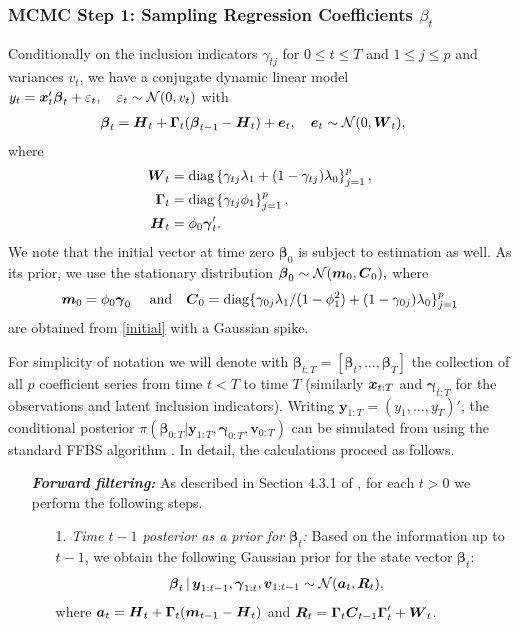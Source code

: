 \documentclass[ba]{imsart}
\numberwithin{equation}{section}
\theoremstyle{plain}
\def\a{\mbox{\boldmath$a$}}
\def\H{\mbox{\boldmath$H$}}
\def\bR{\mbox{\boldmath$R$}}
\def\bG{\bm{\Gamma}}
\def\bC{\mbox{\boldmath$C$}}
\def\x{\mbox{\boldmath$x$}}
\def\y{\mbox{\boldmath$y$}}
\def\b{\mbox{\boldmath$b$}}
\def\W{\mbox{\boldmath$W$}}
\def\m{\mbox{\boldmath$m$}}
\def\seq#1#2{#1{:}#2}
\newcommand{\bm}[1]{\boldsymbol{#1}}
\def\W{\bm{W}}
\def\y{\bm{y}}
\def\bg{\bm{\gamma}}
\def\b{\bm{\beta}}
\begin{document}
{{\subsubsection{MCMC  Step 1: Sampling Regression Coefficients $\beta_t$} 
Conditionally on the inclusion indicators $\gamma_{tj}$ for $0\leq t\leq T$ and $1\leq j\leq p$ and variances $v_t$,  we  have a  conjugate dynamic linear model  $y_t=\x_t'\b_t+\varepsilon_t, \quad \varepsilon_t\sim \mathcal{N}(0,v_t)$ with
\begin{align*}
	\b_t&=\H_t+\bG_t(\b_{t-1}-\H_t)+\bm{e}_t, \quad \bm{e}_t\sim \mathcal{N}(0, \W_t),
\end{align*}
 where
 \begin{align}
 \W_t&=\textrm{diag}\left\{\gamma_{tj}\lambda_{1}+(1-\gamma_{tj})\lambda_{0}\right\}_{j=1}^p,\label{variance_state}\\
 \bG_t &= \textrm{diag}\left\{\gamma_{tj}\phi_{1}\right\}_{j=1}^p,\\
 \H_t &= \phi_0\bg_t'.
 \end{align}
 We note that the initial vector at time zero $\b_{0}$ is subject to estimation as well. As its prior, we use the stationary distribution $\b_{0}\sim\mathcal{N}(\m_0 , \bC_0),$
 where 
 \begin{equation}\label{muC}
 \m_0=\phi_0\bg_0\quad\text{ and} \quad \bC_0=\mathrm{diag}\{\gamma_{0j}\lambda_1/(1-\phi_1^2)+(1-\gamma_{0j})\lambda_0\}_{j=1}^p
 \end{equation}
  are obtained from \eqref{initial} with a Gaussian spike.


  
For simplicity of notation we will denote  with $\b_{t:T}=[\b_{t},\dots,\b_T]$ the collection of all $p$ coefficient series from time $t<T$ to time $T$ (similarly $\x_{t:T}$ and $\bg_{t:T}$ for the observations and latent inclusion indicators). Writing   $\y_{1:T}=(y_1,\dots, y_T)'$, 
the conditional posterior $\pi(\b_{0:T}|\y_{\seq1T},\bg_{0:T},\bm v_{0:T})$ can be simulated  from using the standard  FFBS 
algorithm \citep{Schnatter1994}.  In detail, the calculations  proceed as follows. 

\begin{itemize} 
\item[]{\em\bf Forward filtering:} As described in Section 4.3.1 of \cite{Prado2010}, for each $t>0$ we perform the following steps.
\begin{itemize} 
	\item[1.]{\em Time $t-1$ posterior as a prior for $\b_t$:} Based on the information up to $t-1$, we obtain the following Gaussian prior for the state vector $\b_t$:
		\begin{align*}
		\b_{t}\,|\, \bm y_{\seq1{t-1}},\bg_{1:t},\bm v_{\seq1{t-1}}&\sim \mathcal{N}(\a_{t}, \bR_t), 
		\end{align*}
		where $\a_{t}=\H_t+\bG_t(\m_{t-1}-\H_t)$ and $\bR_{t}=\bG_t\bm C_{t-1}\bG_t'+\W_t$. 
		 

\end{itemize}
\end{itemize}}}
\end{document}
